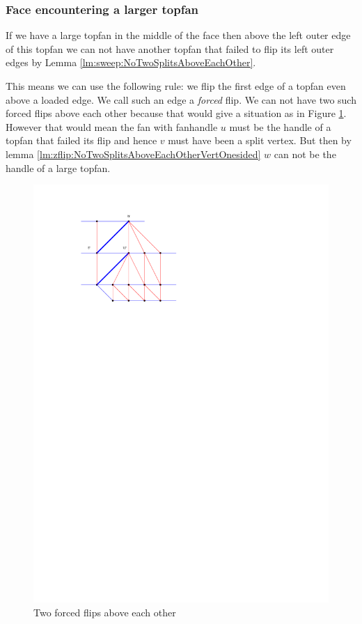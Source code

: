 \subsubsection{Face encountering a larger topfan}
If we have a large topfan in the middle of the face then above the left outer edge of this topfan we can not have another topfan that failed to flip its left outer edges by Lemma \ref{lm:sweep:NoTwoSplitsAboveEachOther}.

This means we can use the following rule: we flip the first edge of a topfan even above a loaded edge.
We call such an edge a \emph{forced} flip. We can not have two such forced flips above each other because that would give a situation as in Figure \ref{fig:subdiv:forcedFlips}.
However that would mean the fan with fanhandle $u$ must be the handle of a topfan that failed its flip and hence $v$ must have been a split vertex. But then by lemma \ref{lm:zflip:NoTwoSplitsAboveEachOtherVertOnesided} $w$ can not be the handle of a large topfan.

\begin{figure}[h]
  \centering
  \includegraphics[scale=1]{blueFaceSubdivision/img/forcedFlips.pdf}
  \caption{Two forced flips above each other}
  \label{fig:subdiv:forcedFlips}
\end{figure}


